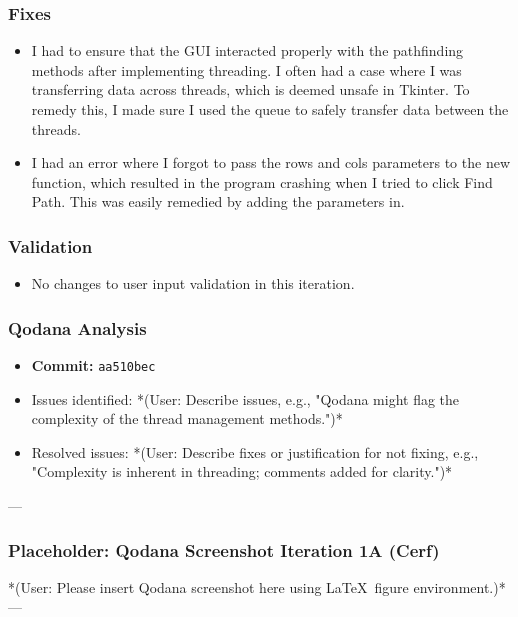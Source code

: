 \subsubsection{Fixes}
\begin{itemize}
	\item I had to ensure that the GUI interacted properly with the pathfinding methods after implementing threading. I often had a case where I was transferring data across threads, which is deemed unsafe in Tkinter. To remedy this, I made sure I used the queue to safely transfer data between the threads.
	
	\item I had an error where I forgot to pass the rows and cols parameters to the new function, which resulted in the program crashing when I tried to click Find Path. This was easily remedied by adding the parameters in.
\end{itemize}

\subsubsection{Validation}
\begin{itemize}
	\item No changes to user input validation in this iteration.
\end{itemize}

\subsubsection{Qodana Analysis}
\begin{itemize}
	\item \textbf{Commit:} \verb|aa510bec|
	\item Issues identified: *(User: Describe issues, e.g., "Qodana might flag the complexity of the thread management methods.")*
	\item Resolved issues: *(User: Describe fixes or justification for not fixing, e.g., "Complexity is inherent in threading; comments added for clarity.")*
\end{itemize}

--- %
\subsubsection*{Placeholder: Qodana Screenshot Iteration 1A (Cerf)}
*(User: Please insert Qodana screenshot here using \LaTeX\ figure environment.)*
---

